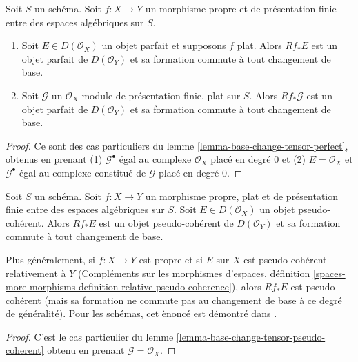 \begin{lemma}
\label{lemma-flat-proper-perfect-direct-image-general}
Soit $S$ un schéma. Soit $f : X \to Y$ un morphisme propre
et de présentation finie entre des espaces algébriques sur $S$.
\begin{enumerate}
\item Soit $E \in D(\mathcal{O}_X)$ un objet parfait et supposons $f$ plat.
Alors
$Rf_*E$ est un objet parfait de $D(\mathcal{O}_Y)$ et sa formation
commute à tout changement de base.
\item Soit $\mathcal{G}$ un $\mathcal{O}_X$-module de présentation finie,
plat sur $S$. Alors $Rf_*\mathcal{G}$ est un objet parfait de
$D(\mathcal{O}_Y)$ et sa formation commute à tout changement de base.
\end{enumerate}
\end{lemma}

\begin{proof}
Ce sont des cas particuliers du
lemme \ref{lemma-base-change-tensor-perfect}, obtenus en prenant
(1) $\mathcal{G}^\bullet$ égal au complexe $\mathcal{O}_X$ placé en degré $0$
et (2) $E = \mathcal{O}_X$ et $\mathcal{G}^\bullet$ égal au complexe constitué
de $\mathcal{G}$ placé en degré $0$.
\end{proof}

\begin{lemma}
\label{lemma-flat-proper-pseudo-coherent-direct-image-general}
Soit $S$ un sch\'ema. Soit $f : X \to Y$ un morphisme propre, plat et
de pr\'esentation finie entre des espaces alg\'ebriques sur $S$.
Soit $E \in D(\mathcal{O}_X)$ un objet
pseudo-coh\'erent. Alors $Rf_*E$ est un objet pseudo-coh\'erent de
$D(\mathcal{O}_Y)$ et sa formation commute \`a tout changement de base.
\end{lemma}

\noindent
Plus g\'en\'eralement, si $f : X \to Y$ est propre et si $E$ sur $X$ est
pseudo-coh\'erent relativement \`a $Y$ (Compl\'ements sur les morphismes d'espaces, d\'efinition
\ref{spaces-more-morphisms-definition-relative-pseudo-coherence}),
alors $Rf_*E$ est pseudo-coh\'erent
(mais sa formation ne commute pas au changement de base \`a ce degr\'e de g\'en\'eralit\'e).
Pour les sch\'emas, cet \`enonc\'e est d\'emontr\'e dans \cite{Kiehl}.

\begin{proof}
C'est le cas particulier du
lemme \ref{lemma-base-change-tensor-pseudo-coherent} obtenu en prenant
$\mathcal{G} = \mathcal{O}_X$.
\end{proof}

